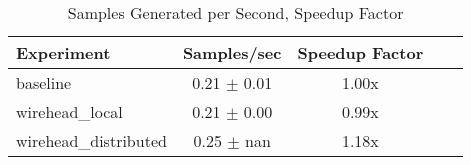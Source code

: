 
\begin{table}[h]
\centering
\begin{tabular}{lcccc}
\hline
Experiment & Samples/sec & Speedup Factor\\
\hline
baseline & 0.21 $\pm$ 0.01 & 1.00x \\
wirehead_local & 0.21 $\pm$ 0.00 & 0.99x \\
wirehead_distributed & 0.25 $\pm$ nan & 1.18x \\
\hline
\end{tabular}
\caption{Samples Generated per Second, Speedup Factor}
\label{tab:samples_generated}
\end{table}

